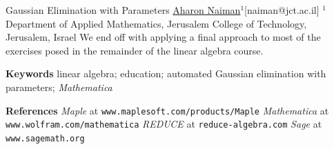 \begin{abstract_online}{Gaussian Elimination with Parameters}{%
        \underline{Aharon Naiman}$^{1}$}{[naiman@jct.ac.il]
        }{%
        $^1$ Department of Applied Mathematics, Jerusalem College of
    Technology, Jerusalem, Israel}
We end off with applying a final approach to most of the exercises
posed in the remainder of the linear algebra course.

\textbf{Keywords} \newline{} linear algebra; education; automated
Gaussian elimination with parameters; \emph{Mathematica}

\textbf{References} \newline{}
\emph{Maple} at \texttt{www.maplesoft.com/products/Maple} \newline{}
\emph{Mathematica} at \texttt{www.wolfram.com/mathematica} \newline{}
\emph{REDUCE} at \texttt{reduce-algebra.com} \newline{}
\emph{Sage} at \texttt{www.sagemath.org} \newline{}
\end{abstract_online}
    
